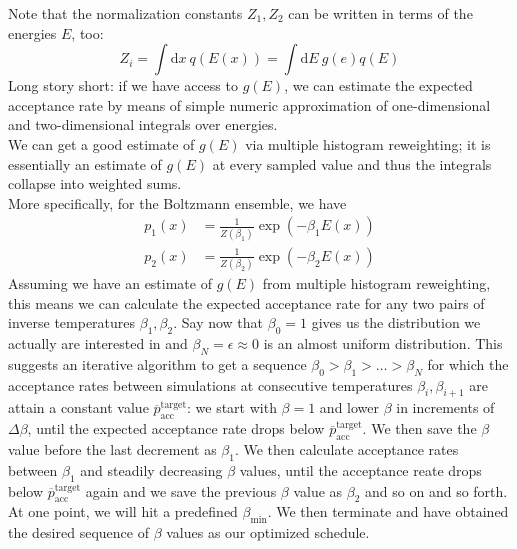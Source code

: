 \documentclass{article}
\renewcommand{\d}{\mathrm{d}}
\begin{document}
Note that the normalization constants $Z_1, Z_2$ can be written in terms of the energies $E$, too:
\begin{equation}
  Z_i = \int \d x \ q(E(x)) = \int \d E \ g(e) q(E)
\end{equation}
Long story short: if we have access to $g(E)$, we can estimate the expected acceptance rate by means of simple numeric approximation of one-dimensional and two-dimensional integrals over energies.\\
We can get a good estimate of $g(E)$ via multiple histogram reweighting; it is essentially an estimate of $g(E)$ at every sampled value and thus the integrals collapse into weighted sums.\\
More specifically, for the Boltzmann ensemble, we have
\begin{eqnarray}
  p_1(x) &= \frac{1}{Z(\beta_1)}\exp(-\beta_1 E(x)) \\
  p_2(x) &= \frac{1}{Z(\beta_2)}\exp(-\beta_2 E(x))
\end{eqnarray}
Assuming we have an estimate of $g(E)$ from multiple histogram reweighting, this means we can calculate the expected acceptance rate for any two pairs of inverse temperatures $\beta_1, \beta_2$. Say now that $\beta_0=1$ gives us the distribution we actually are interested in and $\beta_N=\epsilon \approx 0$ is an almost uniform distribution. This suggests an iterative algorithm to get a sequence $\beta_0 > \beta_1 > \ldots > \beta_N$ for which the acceptance rates between simulations at consecutive temperatures $\beta_i, \beta_{i+1}$ are attain a constant value $\overline p_{\mathrm{acc}}^\mathrm{target}$: we start with $\beta = 1$ and lower $\beta$ in increments of $\Delta\beta$, until the expected acceptance rate drops below $\overline p_{\mathrm{acc}}^\mathrm{target}$. We then save the $\beta$ value before the last decrement as $\beta_1$. We then calculate acceptance rates between $\beta_1$ and steadily decreasing $\beta$ values, until the acceptance reate drops below $\overline p_{\mathrm{acc}}^\mathrm{target}$ again and we save the previous $\beta$ value as $\beta_2$ and so on and so forth. At one point, we will hit a predefined $\beta_{\mathrm{min}}$. We then terminate and have obtained the desired sequence of $\beta$ values as our optimized schedule.
\end{document}
